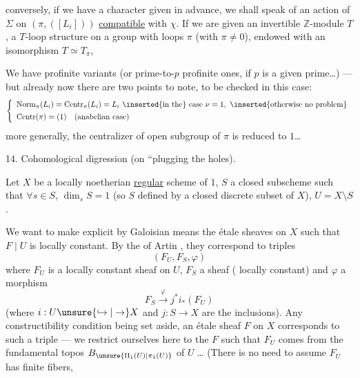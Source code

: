 

conversely, if we have a character  given in advance,
we shall speak of an action of $\Sigma$ on $(\pi,([L_i]))$
\uline{compatible} with $\chi$. If we are given an
invertible $\mathbb Z$-module $T$, a $T$-loop structure
on a group with loops $\pi$ (with $\pi\ne0$), endowed
with an isomorphism $T\simeq T_\pi$, 

We have profinite variants
(or prime-to-$p$ profinite ones, if $p$ is a given
prime\dots) --- but already now there are
two points to note, to be checked in
this case:
\[
\left\{
\begin{array}{l}
\operatorname{Norm}_{\pi}(L_i)=\operatorname{Centr}_{\pi}(L_i)=L_i
\ \inserted{\text{in the}}\ \text{case }\nu=1,\ \inserted{\text{otherwise no problem}}\\[4pt]
\operatorname{Centr}(\pi)=(1)\quad(\text{anabelian case})
\end{array}
\right.
\]
more generally, the centralizer
of  open subgroup of $\pi$
is reduced to $1$\dots
{}



14. Cohomological digression (on  ``plugging the
holes).

Let $X$ be a locally noetherian \uline{regular} scheme of
 $1$, $S$ a closed subscheme  such that
$\forall s\in S$, $\dim_s S=1$ (so $S$ defined by a
closed discrete subset of $X$), $U=X\setminus S$.

We want to make explicit by Galoisian means the
étale sheaves   on $X$ such that $F\mid U$ is
locally constant. By the  of Artin , they
correspond to triples
\[
(F_U,F_S,\varphi)
\]
where $F_U$ is a  locally constant sheaf on $U$,
$F_S$ a sheaf ( locally constant)
and $\varphi$ a morphism
\[
F_S\xrightarrow{\varphi}j^{*}i_{*}(F_U)
\]
(where $i:U\unsure{\hookrightarrow|\to}X$ and $j:S\to X$ are the inclusions).
Any constructibility condition being set
aside, an étale sheaf $F$ on $X$ corresponds
to such a triple --- we restrict ourselves here to the
$F$ such that $F_U$  comes from the
fundamental topos $B_{\unsure{\Pi_1(U)|\pi_1(U)}}$ of $U$ \dots
(There is no need to assume $F_U$ has finite fibers,

